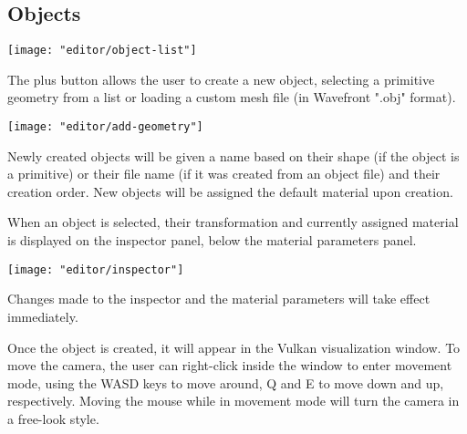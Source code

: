 \subsection{Objects}

\texttt{[image: "editor/object-list"]}

The plus button allows the user to create a new object, selecting a primitive geometry from a list or loading a custom mesh file (in Wavefront ".obj" format).

\texttt{[image: "editor/add-geometry"]}

Newly created objects will be given a name based on their shape (if the object is a primitive) or their file name (if it was created from an object file) and their creation order. New objects will be assigned the default material upon creation.

When an object is selected, their transformation and currently assigned material is displayed on the inspector panel, below the material parameters panel.

\texttt{[image: "editor/inspector"]}

Changes made to the inspector and the material parameters will take effect immediately.

Once the object is created, it will appear in the Vulkan visualization window. To move the camera, the user can right-click inside the window to enter movement mode, using the WASD keys to move around, Q and E to move down and up, respectively. Moving the mouse while in movement mode will turn the camera in a free-look style.
